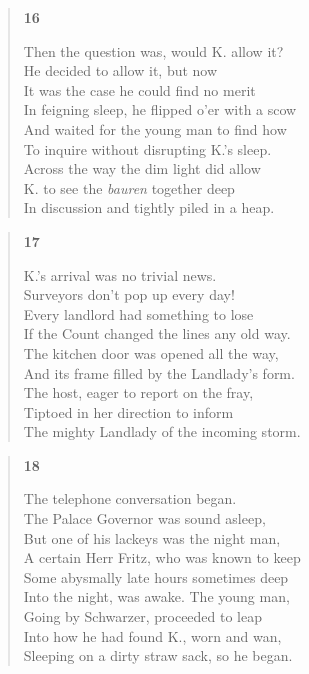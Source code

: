 \documentclass{article}
\begin{document}
\newpage
\begin{verse}
  \begin{center}
    \textbf{16} \\
  \end{center}
  Then the question was, would K. allow it? \\
  He decided to allow it, but now \\
  It was the case he could find no merit \\
  In feigning sleep, he flipped o'er with a scow \\
  And waited for the young man to find how \\
  To inquire without disrupting K.'s sleep. \\
  Across the way the dim light did allow \\
  K. to see the \textit{bauren} together deep \\
  In discussion and tightly piled in a heap.
\end{verse}
\begin{verse}
  \begin{center}
    \textbf{17} \\
  \end{center}
  K.'s arrival was no trivial news. \\
  Surveyors don't pop up every day! \\
  Every landlord had something to lose \\
  If the Count changed the lines any old way. \\
  The kitchen door was opened all the way, \\
  And its frame filled by the Landlady's form. \\
  The host, eager to report on the fray, \\
  Tiptoed in her direction to inform \\
  The mighty Landlady of the incoming storm.
\end{verse}
\begin{verse}
  \begin{center}
    \textbf{18} \\
  \end{center}
  The telephone conversation began. \\
  The Palace Governor was sound asleep, \\
  But one of his lackeys was the night man, \\
  A certain Herr Fritz, who was known to keep \\
  Some abysmally late hours sometimes deep \\
  Into the night, was awake. The young man, \\
  Going by Schwarzer, proceeded to leap \\
  Into how he had found K., worn and wan, \\
  Sleeping on a dirty straw sack, so he began.
\end{verse}
\end{document}
